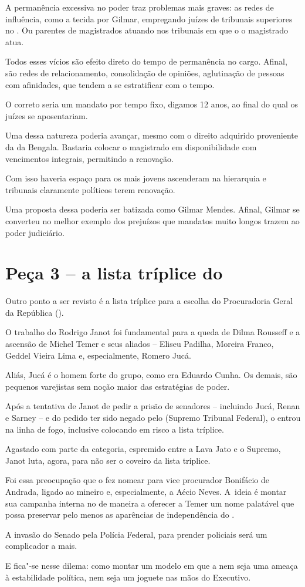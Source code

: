 A permanência excessiva no poder traz problemas mais graves: as redes de
influência, como a tecida por Gilmar, empregando juízes de tribunais
superiores no . Ou parentes de magistrados atuando nos tribunais em
que o o magistrado atua.

Todos esses vícios são efeito direto do tempo de permanência no cargo.
Afinal, são redes de relacionamento, consolidação de opiniões,
aglutinação de pessoas com afinidades, que tendem a se estratificar com
o tempo.

O correto seria um mandato por tempo fixo, digamos 12 anos, ao final do
qual os juízes se aposentariam.

Uma  dessa natureza poderia avançar, mesmo com o direito adquirido
proveniente da  da Bengala. Bastaria colocar o magistrado em
disponibilidade com vencimentos integrais, permitindo a renovação.

Com isso haveria espaço para os mais jovens ascenderam na hierarquia e
tribunais claramente políticos terem renovação.

Uma proposta dessa poderia ser batizada como  Gilmar Mendes. Afinal,
Gilmar se converteu no melhor exemplo dos prejuízos que mandatos muito
longos trazem ao poder judiciário.

\section{Peça 3 -- a lista tríplice do }

Outro ponto a ser revisto é a lista tríplice para a escolha do
Procuradoria Geral da República ().

O trabalho do  Rodrigo Janot foi fundamental para a queda de Dilma
Rousseff e a ascensão de Michel Temer e seus aliados -- Eliseu Padilha,
Moreira Franco, Geddel Vieira Lima e, especialmente, Romero Jucá.

Aliás, Jucá é o homem forte do grupo, como era Eduardo Cunha. Os demais,
são pequenos varejistas sem noção maior das estratégias de poder.

Após a tentativa de Janot de pedir a prisão de senadores -- incluindo
Jucá, Renan e Sarney -- e do pedido ter sido negado pelo  (Supremo
Tribunal Federal), o  entrou na linha de fogo, inclusive colocando em
risco a lista tríplice.

Agastado com parte da categoria, espremido entre a Lava Jato e o
Supremo, Janot luta, agora, para não ser o coveiro da lista tríplice.

Foi essa preocupação que o fez nomear para vice procurador Bonifácio de
Andrada, ligado ao  mineiro e, especialmente, a Aécio Neves. A~ideia
é montar sua campanha interna no  de maneira a oferecer a Temer um
nome palatável que possa preservar pelo menos as aparências de
independência do .

A invasão do Senado pela Polícia Federal, para prender policiais será um
complicador a mais.

E fica"-se nesse dilema: como montar um modelo em que a  nem seja uma
ameaça à estabilidade política, nem seja um joguete nas mãos do
Executivo.
